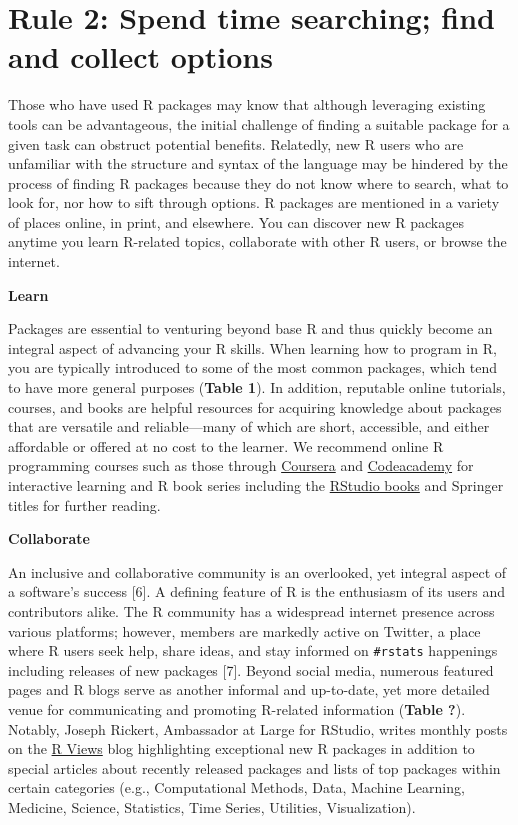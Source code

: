 \documentclass[10pt,letterpaper]{article}
\begin{document}
\hypertarget{rule-2-spend-time-searching-find-and-collect-options}{%
\section{Rule 2: Spend time searching; find and collect
options}\label{rule-2-spend-time-searching-find-and-collect-options}}

Those who have used R packages may know that although leveraging
existing tools can be advantageous, the initial challenge of finding a
suitable package for a given task can obstruct potential benefits.
Relatedly, new R users who are unfamiliar with the structure and syntax
of the language may be hindered by the process of finding R packages
because they do not know where to search, what to look for, nor how to
sift through options. R packages are mentioned in a variety of places
online, in print, and elsewhere. You can discover new R packages anytime
you learn R-related topics, collaborate with other R users, or browse
the internet.

\textbf{Learn}

Packages are essential to venturing beyond base R and thus quickly
become an integral aspect of advancing your R skills. When learning how
to program in R, you are typically introduced to some of the most common
packages, which tend to have more general purposes (\textbf{Table 1}).
In addition, reputable online tutorials, courses, and books are helpful
resources for acquiring knowledge about packages that are versatile and
reliable---many of which are short, accessible, and either affordable or
offered at no cost to the learner. We recommend online R programming
courses such as those through
\href{https://www.coursera.org/learn/r-programming}{Coursera} and
\href{https://www.codecademy.com/learn/learn-r}{Codeacademy} for
interactive learning and R book series including the
\href{https://rstudio.com/resources/books/}{RStudio books} and Springer
titles for further reading.

\textbf{Collaborate}

An inclusive and collaborative community is an overlooked, yet integral
aspect of a software's success {[}6{]}. A defining feature of R is the
enthusiasm of its users and contributors alike. The R community has a
widespread internet presence across various platforms; however, members
are markedly active on Twitter, a place where R users seek help, share
ideas, and stay informed on \texttt{\#rstats} happenings including
releases of new packages {[}7{]}. Beyond social media, numerous featured
pages and R blogs serve as another informal and up-to-date, yet more
detailed venue for communicating and promoting R-related information
(\textbf{Table ?}). Notably, Joseph Rickert, Ambassador at Large for
RStudio, writes monthly posts on the
\href{https://rviews.rstudio.com/}{R Views} blog highlighting
exceptional new R packages in addition to special articles about
recently released packages and lists of top packages within certain
categories (e.g., Computational Methods, Data, Machine Learning,
Medicine, Science, Statistics, Time Series, Utilities, Visualization).
\end{document}
